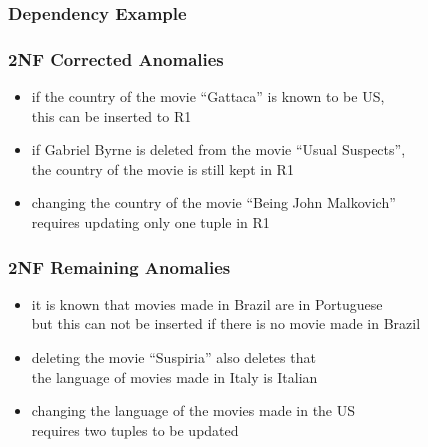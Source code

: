\documentclass[dvipsnames]{beamer}
\begin{document}
\begin{frame}
  \frametitle{Dependency Example}

  \begin{center}
  \end{center}
\end{frame}

\begin{frame}
  \frametitle{2NF Corrected Anomalies}

  \hyperlink{example_db_2}{}

  \begin{itemize}
    \item if the country of the movie ``Gattaca'' is known to be US,\\
      this can be inserted to R1

    \pause
    \medskip
    \item if Gabriel Byrne is deleted from the movie ``Usual Suspects'',\\
      the country of the movie is still kept in R1

    \pause
    \medskip
    \item changing the country of the movie ``Being John Malkovich''\\
      requires updating only one tuple in R1
  \end{itemize}
\end{frame}

\begin{frame}
  \frametitle{2NF Remaining Anomalies}

  \hyperlink{example_db_2}{}

  \begin{itemize}
    \item it is known that movies made in Brazil are in Portuguese\\
      but this can not be inserted if there is no movie made in Brazil

    \pause
    \medskip
    \item deleting the movie ``Suspiria'' also deletes that\\
      the language of movies made in Italy is Italian

    \pause
    \medskip
    \item changing the language of the movies made in the US\\
      requires two tuples to be updated
  \end{itemize}
\end{frame}
\end{document}
